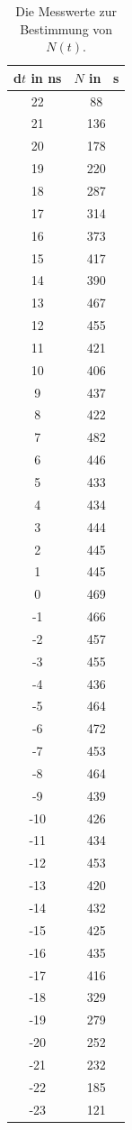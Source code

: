 \documentclass[
  bibliography=totoc,     %
  captions=tableheading,  %
  titlepage=firstiscover, %
]{scrartcl}
\begin{document}
\begin{table}[H]
\centering
\begin{tabular}{c c}
    \toprule
    d$t$ in \si{\nano\second} & $N$ in \si{\per20\second} \\
    \midrule
    22  & 88 \\
    21  & 136 \\
    20  & 178 \\
    19  & 220 \\
    18  & 287 \\
    17  & 314 \\
    16  & 373 \\
    15  & 417 \\
    14  & 390 \\
    13  & 467 \\
    12  & 455 \\
    11  & 421 \\
    10  & 406 \\
    9   & 437 \\
    8   & 422 \\
    7   & 482 \\
    6   & 446 \\
    5   & 433 \\
    4   & 434 \\
    3   & 444 \\
    2   & 445 \\
    1   & 445 \\
    0   & 469 \\
    -1  & 466 \\
    -2  & 457 \\
    -3  & 455 \\
    -4  & 436 \\
    -5  & 464 \\
    -6  & 472 \\
    -7  & 453 \\
    -8  & 464 \\
    -9  & 439 \\
    -10 & 426 \\
    -11 & 434 \\
    -12 & 453 \\
    -13 & 420 \\
    -14 & 432 \\
    -15 & 425 \\
    -16 & 435 \\
    -17 & 416 \\
    -18 & 329 \\
    -19 & 279 \\
    -20 & 252 \\
    -21 & 232 \\
    -22 & 185 \\
    -23 & 121 \\
    \bottomrule
  \end{tabular}
    \caption{Die Messwerte zur Bestimmung von $N(t)$.}
    \label{tab:1}
\end{table}
\end{document}

